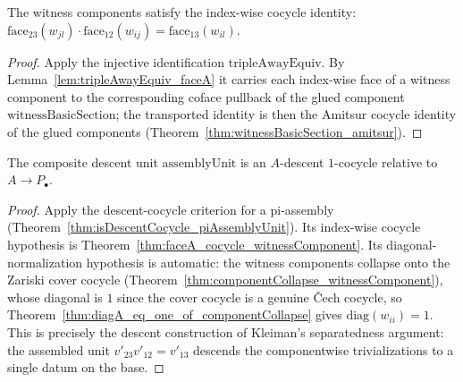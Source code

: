 \begin{theorem}
  \label{thm:faceA_cocycle_witnessComponent}
  \leanok
  The witness components satisfy the index-wise cocycle identity:
  \(\mathrm{face}_{23}(w_{jl}) \cdot \mathrm{face}_{12}(w_{ij}) = \mathrm{face}_{13}(w_{il})\).
\end{theorem}
\begin{proof}
  \leanok
  Apply the injective identification \(\mathrm{tripleAwayEquiv}\). By
  Lemma~\ref{lem:tripleAwayEquiv_faceA} it carries each index-wise face of a witness component
  to the corresponding coface pullback of the glued component
  \(\mathrm{witnessBasicSection}\); the transported identity is then the Amitsur cocycle
  identity of the glued components (Theorem~\ref{thm:witnessBasicSection_amitsur}).
\end{proof}

\begin{theorem}
  \label{thm:isDescentCocycle_assemblyUnit}
  \leanok
  The composite descent unit \(\mathrm{assemblyUnit}\) is an \(A\)-descent \(1\)-cocycle
  relative to \(A \to P_{\!\bullet}\).
\end{theorem}
\begin{proof}
  \leanok
  Apply the descent-cocycle criterion for a pi-assembly
  (Theorem~\ref{thm:isDescentCocycle_piAssemblyUnit}). Its index-wise cocycle hypothesis is
  Theorem~\ref{thm:faceA_cocycle_witnessComponent}. Its diagonal-normalization hypothesis is
  automatic: the witness components collapse onto the Zariski cover cocycle
  (Theorem~\ref{thm:componentCollapse_witnessComponent}), whose diagonal is \(1\) since the
  cover cocycle is a genuine \v Cech cocycle, so
  Theorem~\ref{thm:diagA_eq_one_of_componentCollapse} gives \(\mathrm{diag}(w_{ii}) = 1\). This
  is precisely the descent construction of Kleiman's separatedness argument: the assembled unit
  \(v'_{23} v'_{12} = v'_{13}\) descends the componentwise trivializations to a single datum on
  the base.
\end{proof}

